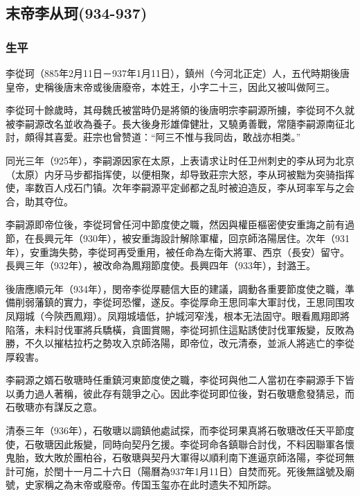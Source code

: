 
\subsection{末帝李从珂\tiny(934-937)}

\subsubsection{生平}

李從珂（885年2月11日－937年1月11日），鎮州（今河北正定）人，五代時期後唐皇帝，史稱後唐末帝或後唐廢帝，本姓王，小字二十三，因此又被叫做阿三。

李從珂十餘歲時，其母魏氏被當時仍是將領的後唐明宗李嗣源所擄，李從珂不久就被李嗣源改名並收為養子。長大後身形雄偉健壯，又驍勇善戰，常隨李嗣源南征北討，頗得其喜愛。莊宗也曾赞道：“阿三不惟与我同齿，敢战亦相类。”

同光三年（925年），李嗣源因家在太原，上表请求让时任卫州刺史的李从珂为北京（太原）内牙马步都指挥使，以便相聚，却导致莊宗大怒，李从珂被黜为突骑指挥使，率数百人戍石门镇。次年李嗣源平定邺都之乱时被迫造反，李从珂率军与之会合，助其夺位。

李嗣源即帝位後，李從珂曾任河中節度使之職，然因與權臣樞密使安重誨之前有過節，在長興元年（930年），被安重誨設計解除軍權，回京師洛陽居住。次年（931年），安重誨失勢，李從珂再受重用，被任命為左衛大將軍、西京（長安）留守。長興三年（932年），被改命為鳳翔節度使。長興四年（933年），封潞王。

後唐應順元年（934年），閔帝李從厚聽信大臣的建議，調動各重要節度使之職，準備削弱藩鎮的實力，李從珂恐懼，遂反。李從厚命王思同率大軍討伐，王思同围攻凤翔城（今陝西鳳翔）。凤翔城墙低，护城河窄浅，根本无法固守。眼看鳳翔即將陷落，未料討伐軍將兵驕橫，貪圖賞賜，李從珂抓住這點誘使討伐軍叛變，反敗為勝，不久以摧枯拉朽之勢攻入京師洛陽，即帝位，改元清泰，並派人將逃亡的李從厚殺害。

李嗣源之婿石敬瑭時任重鎮河東節度使之職，李從珂與他二人當初在李嗣源手下皆以勇力過人著稱，彼此存有競爭之心。因此李從珂即位後，對石敬瑭愈發猜忌，而石敬瑭亦有謀反之意。

清泰三年（936年），石敬瑭以調鎮他處試探，而李從珂果真將石敬瑭改任天平節度使，石敬瑭因此叛變，同時向契丹乞援。李從珂命各鎮聯合討伐，不料因聯軍各懷鬼胎，致大敗於團柏谷，石敬瑭與契丹大軍得以順利南下進逼京師洛陽，李從珂無計可施，於閏十一月二十六日（陽曆為937年1月11日）自焚而死。死後無諡號及廟號，史家稱之為末帝或廢帝。传国玉玺亦在此时遗失不知所踪。

